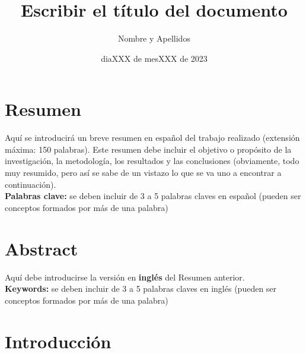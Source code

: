 \documentclass[11pt,a4paper,spanish]{book}
\title{Escribir el título del documento}
\author{Nombre y Apellidos}
\date{diaXXX de mesXXX de 2023}
\begin{document}
\renewcommand{\listfigurename}{Índice de figuras}
\renewcommand{\listtablename}{Índice de tablas}
\renewcommand{\contentsname}{Índice de contenidos}
\renewcommand{\figurename}{Figura}
\renewcommand{\tablename}{Tabla} 

\maketitle

\frontmatter
\tableofcontents
\listoffigures %
\listoftables %

\chapter{Resumen}
Aquí se introducirá un breve resumen en español del trabajo realizado (extensión máxima: 150 palabras). Este resumen debe incluir el objetivo o propósito de la investigación, la metodología, los resultados y las conclusiones (obviamente, todo muy resumido, pero así se sabe de un vistazo lo que se va uno a encontrar a continuación).\\


{\bf Palabras clave:} se deben incluir de 3 a 5 palabras claves en español (pueden ser conceptos formados por más de una palabra)

\chapter{Abstract}
Aquí debe introducirse la versión en {\bf inglés} del Resumen anterior.\\


{\bf Keywords:} se deben incluir de 3 a 5 palabras claves en inglés  (pueden ser conceptos formados por más de una palabra)




\mainmatter
\chapter{Introducción}
\end{document}
